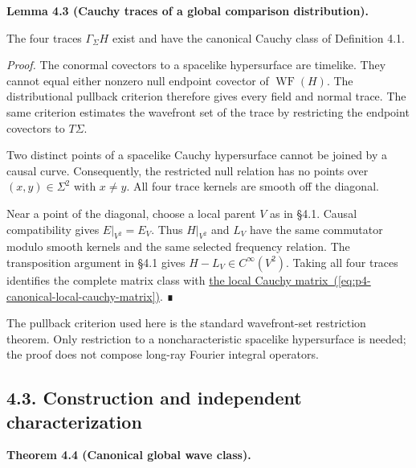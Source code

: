 \documentclass[
  english,
  11pt,
  reqno]{amsart}
\makeatletter
\newcommand{\paperdisplaynext}{%
  \let\paper@savedstartsection\@startsection
  \def\@startsection##1##2##3##4##5##6{%
    \let\@startsection\paper@savedstartsection
    \@tempskipa ##5\relax
    \ifdim\@tempskipa<\z@
      \def\paper@afterskip{.35\baselineskip}%
    \else
      \def\paper@afterskip{##5}%
    \fi
    \@startsection{##1}{##2}{##3}{##4}{\paper@afterskip}{##6}}}
\newcommand{\paperdisplaysection}{\paperdisplaynext\subsection}
\newcommand{\pandocstatementheading}[1]{%
  \par\if@nobreak\else
    \addpenalty{\@beginparpenalty}%
    \addvspace{.5\baselineskip plus .2\baselineskip minus .2\baselineskip}%
  \fi
  {\normalfont\bfseries #1\par}%
  \nobreak\@afterindenttrue\@afterheading
}
\makeatother
\begin{document}
\pandocstatementheading{\protect{}\label{lem:p4-witness-cauchy-traces}Lemma 4.3 (Cauchy traces of a global comparison distribution).}

The four traces \(\Gamma_\Sigma H\) exist and have the canonical Cauchy
class of Definition 4.1.

\emph{Proof.} The conormal covectors to a spacelike hypersurface are
timelike. They cannot equal either nonzero null endpoint covector of
\(\operatorname{WF}(H)\). The distributional pullback criterion
therefore gives every field and normal trace. The same criterion
estimates the wavefront set of the trace by restricting the endpoint
covectors to \(T\Sigma\).

Two distinct points of a spacelike Cauchy hypersurface cannot be joined
by a causal curve. Consequently, the restricted null relation has no
points over \((x,y)\in\Sigma^2\) with \(x\ne y\). All four trace kernels
are smooth off the diagonal.

Near a point of the diagonal, choose a local parent \(V\) as in §4.1.
Causal compatibility gives \(E|_{V^2}=E_V\). Thus \(H|_{V^2}\) and
\(L_V\) have the same commutator modulo smooth kernels and the same
selected frequency relation. The transposition argument in §4.1 gives
\(H-L_V\in C^\infty(V^2)\). Taking all four traces identifies the
complete matrix class with
\hyperref[eq:p4-canonical-local-cauchy-matrix]{the local Cauchy matrix~(\ref*{eq:p4-canonical-local-cauchy-matrix})}.
∎

The pullback criterion used here is the standard wavefront-set
restriction theorem. Only restriction to a noncharacteristic spacelike
hypersurface is needed; the proof does not compose long-ray Fourier
integral operators.

\protect{}\label{sec:p4-canonical-global-kernel}
\paperdisplaysection{4.3. Construction and independent
characterization}\label{construction-and-independent-characterization}
\pandocstatementheading{\protect{}\label{thm:p4-global-canonical-wave-class}Theorem 4.4 (Canonical global wave class).}
\end{document}

